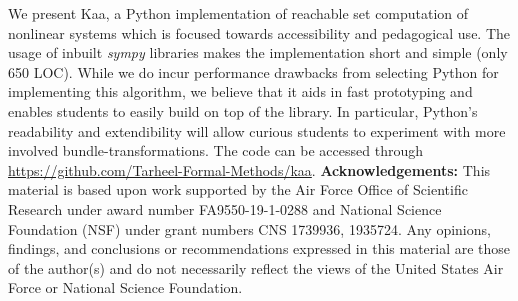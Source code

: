 \documentclass[EPiC]{easychair}
\begin{document}
We present Kaa, a Python implementation of reachable set computation of nonlinear systems which is focused towards accessibility and pedagogical use.
%
The usage of inbuilt \emph{sympy} libraries makes the implementation short and simple (only 650 LOC).
%
While we do incur performance drawbacks from selecting Python for implementing this algorithm, we believe that it aids in fast prototyping and enables students to easily build on top of the library. In particular, Python's readability and extendibility will allow curious students to experiment with more involved bundle-transformations. 
%
The code can be accessed through \url{https://github.com/Tarheel-Formal-Methods/kaa}.
\newline
\newline
{\bf Acknowledgements: } This material is based upon work supported by the Air Force Office of Scientific Research under award number FA9550-19-1-0288 and National Science Foundation (NSF) under grant numbers CNS 1739936, 1935724. Any opinions, findings, and conclusions or recommendations expressed in this material are those of the author(s) and do not necessarily reflect the views of the United States Air Force or National Science Foundation. 



\newpage
\end{document}
